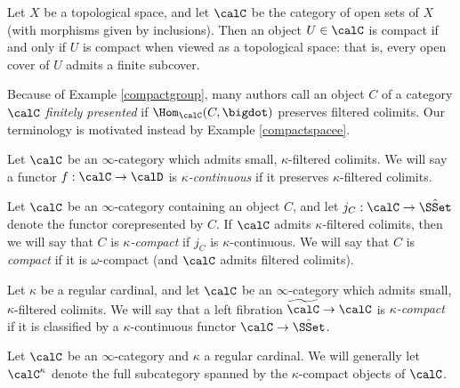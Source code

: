 \begin{example}\label{compactspacee}
Let $X$ be a topological space, and let $\calC$ be the category of open sets of $X$ (with morphisms given by inclusions). Then an object $U \in \calC$ is compact if and only if $U$ is compact when viewed as a topological space: that is, every open cover of $U$ admits a finite subcover.
\end{example}

\begin{remark}
Because of Example \ref{compactgroup}, many authors call an object $C$ of a category $\calC$ {\it finitely presented} if $\Hom_{\calC}(C, \bigdot)$ preserves filtered colimits. Our terminology is motivated instead by Example \ref{compactspacee}.
\end{remark}

\begin{definition}\label{kcontdef}
Let $\calC$ be an $\infty$-category which admits small, $\kappa$-filtered colimits. We will say a functor $f: \calC \rightarrow \calD$ is {\it $\kappa$-continuous} if it preserves $\kappa$-filtered colimits.

Let $\calC$ be an $\infty$-category containing an object $C$, and let
$j_{C}: \calC \rightarrow \hat{\SSet}$ denote the functor corepresented by $C$.
If $\calC$ admits $\kappa$-filtered colimits, then we will say that $C$ is {\it $\kappa$-compact}
if $j_{C}$ is $\kappa$-continuous. We will say that $C$ is {\it compact} if
it is $\omega$-compact (and $\calC$ admits filtered colimits).

Let $\kappa$ be a regular cardinal, and let $\calC$ be an $\infty$-category which admits small, $\kappa$-filtered colimits. We will say that a left fibration $\widetilde{\calC} \rightarrow \calC$
is {\it $\kappa$-compact} if it is classified by a $\kappa$-continuous functor
$\calC \rightarrow \hat{\SSet}$.
\end{definition}

\begin{notation}
Let $\calC$ be an $\infty$-category and $\kappa$ a regular cardinal. We will generally let
$\calC^{\kappa}$ denote the full subcategory spanned by the $\kappa$-compact objects of $\calC$. 
\end{notation}

